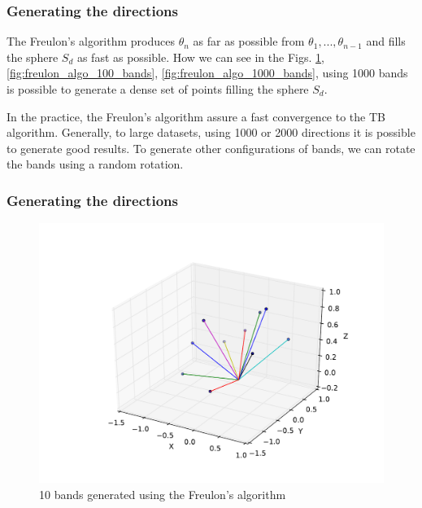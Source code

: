 \documentclass{beamer}
\begin{document}
\begin{frame}
\frametitle{Generating the directions}

The Freulon's algorithm produces $\theta_n$ as far as possible from $\theta_1, ... , \theta_{n-1}$ and fills the sphere $S_d$ as
fast as possible. How we can see in the Figs. \ref{fig:freulon_algo_10_bands}, \ref{fig:freulon_algo_100_bands}, 
\ref{fig:freulon_algo_1000_bands}, using 1000 bands is possible to generate a dense set of points filling the sphere $S_d$.

In the practice, the Freulon's algorithm assure a fast convergence to the TB algorithm. Generally, to large datasets, using 1000 or 2000 directions
it is possible to generate good results. To generate other configurations of bands, we can rotate the bands using a random rotation.
\end{frame}


\begin{frame}
\frametitle{Generating the directions}
\begin{figure}
\begin{center}
\includegraphics[height=0.7\textheight]{freulon_algo_10_bands.pdf}
\end{center}
\caption{10 bands generated using the Freulon's algorithm}
\label{fig:freulon_algo_10_bands}
\end{figure}
\end{frame}
\end{document}
